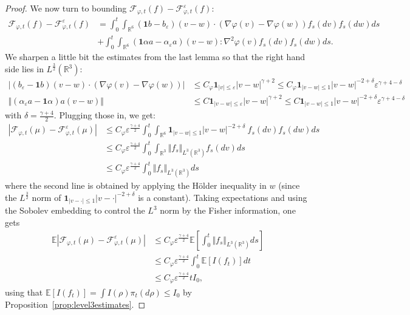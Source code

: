 \documentclass[11pt,a4paper]{article}
\theoremstyle{definition}
\theoremstyle{plain}
\begin{document}
\begin{proof}
    We now turn to bounding $\mathcal{F}_{\varphi,t}(f)-\mathcal{F}_{\varphi,t}^\varepsilon(f)$:
    \begin{align*}
        \mathcal{F}_{\varphi,t}(f)-\mathcal{F}_{\varphi,t}^\varepsilon(f)&= \int_0^t \int_{\mathbb{R}^6} (\mathbf{1}b - b_\varepsilon)(v-w) \cdot (\nabla\varphi(v)-\nabla\varphi(w) ) f_s(dv)f_s(dw) ds\\
    &+ \int_0^t \int_{\mathbb{R}^6} (\mathbf{1}\alpha a - \alpha_\varepsilon a)(v-w):\nabla^2\varphi(v) f_s(dv)f_s(dw) ds.
    \end{align*}
    We sharpen a little bit the estimates from the last lemma so that the right hand side lies in $L^{\frac{3}{2}}(\mathbb{R}^3)$:
    \begin{align*}
    \vert (b_\varepsilon - \mathbf{1}b)(v-w)\cdot (\nabla\varphi(v)-\nabla\varphi(w))\vert &\leq C_\varphi \mathbf{1}_{\vert v \vert \leq \varepsilon}\vert v-w \vert^{\gamma + 2}  \leq C_\varphi\mathbf{1}_{\vert v-w \vert \leq 1} \vert v-w \vert^{-2+\delta} \varepsilon^{\gamma+4-\delta}\\
    \Vert( \alpha_\varepsilon a - \mathbf{1}\alpha) a(v-w)\Vert &\leq C \mathbf{1}_{\vert v-w \vert \leq \varepsilon}\vert v -w\vert^{\gamma + 2}  \leq C \mathbf{1}_{\vert v-w \vert \leq 1} \vert v -w\vert^{-2+\delta}  \varepsilon^{\gamma+4-\delta}
    \end{align*}
    with $\delta=\frac{\gamma + 4}{2}$. Plugging those in, we get:
    \begin{align*}
        \left\vert \mathcal{F}_{\varphi,t}(\mu)-\mathcal{F}_{\varphi,t}^\varepsilon(\mu) \right\vert&\leq C_\varphi \varepsilon^{\frac{\gamma+4}{2}}\int_0^t \int_{\mathbb{R}^6} \mathbf{1}_{\vert v-w \vert \leq 1} \vert v-w \vert^{-2+\delta}  \ f_s(dv)f_s(dw) ds\\
    &\leq C_\varphi \varepsilon^{\frac{\gamma+4}{2}}\int_0^t \int_{\mathbb{R}^3} \Vert f_s\Vert_{L^3(\mathbb{R}^3)} f_s(dv) ds\\
    &\leq C_\varphi \varepsilon^{\frac{\gamma+4}{2}}\int_0^t \Vert f_s\Vert_{L^3(\mathbb{R}^3)} ds
    \end{align*}
    where the second line is obtained by applying the Hölder inequality in $w$ (since the $L^\frac{3}{2}$ norm of $\mathbf{1}_{\vert v-\cdot \vert \leq 1} \vert v-\cdot \vert^{-2+\delta}$ is a constant).
    Taking expectations and using the Sobolev embedding to control the $L^3$ norm by the Fisher information, one gets
    \begin{align*}
        \mathbb{E}\left\vert \mathcal{F}_{\varphi,t}(\mu)-\mathcal{F}_{\varphi,t}^\varepsilon(\mu) \right\vert&\leq C_\varphi \varepsilon^{\frac{\gamma+4}{2}} \mathbb{E}\left[\int_0^t \Vert f_s\Vert_{L^3(\mathbb{R}^3)}  ds \right]\\
        &\leq C_\varphi \varepsilon^{\frac{\gamma+4}{2}} \int_0^t \mathbb{E}\left[I(f_t)\right]  dt \\
        &\leq C_\varphi \varepsilon^{\frac{\gamma+4}{2}} t I_0,
    \end{align*}
    using that $\mathbb{E}\left[I(f_t)\right]=\int I(\rho)\pi_t(d\rho)\leq I_0$ by Proposition~\ref{prop:level3estimates}.
\end{proof}
\end{document}
